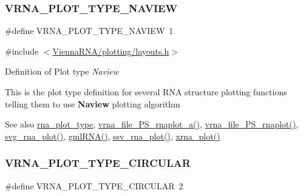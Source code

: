 \subsubsection{\texorpdfstring{V\+R\+N\+A\+\_\+\+P\+L\+O\+T\+\_\+\+T\+Y\+P\+E\+\_\+\+N\+A\+V\+I\+EW}{VRNA\_PLOT\_TYPE\_NAVIEW}}
{\footnotesize\ttfamily \#define V\+R\+N\+A\+\_\+\+P\+L\+O\+T\+\_\+\+T\+Y\+P\+E\+\_\+\+N\+A\+V\+I\+EW~1}



{\ttfamily \#include $<$\hyperlink{layouts_8h}{Vienna\+R\+N\+A/plotting/layouts.\+h}$>$}



Definition of Plot type {\itshape Naview} 

This is the plot type definition for several R\+NA structure plotting functions telling them to use {\bfseries Naview} plotting algorithm

\begin{DoxySeeAlso}{See also}
\hyperlink{group__plotting__utils_ga5964c4581431b098b80027d6e14dcdd4}{rna\+\_\+plot\+\_\+type}, \hyperlink{group__plotting__utils_ga139a31dd0ba9fc6612431f67de901c31}{vrna\+\_\+file\+\_\+\+P\+S\+\_\+rnaplot\+\_\+a()}, \hyperlink{group__plotting__utils_gabdc8f6548ba4a3bc3cd868ccbcfdb86a}{vrna\+\_\+file\+\_\+\+P\+S\+\_\+rnaplot()}, \hyperlink{group__plotting__utils_gae7853539b5df98f294b4af434e979304}{svg\+\_\+rna\+\_\+plot()}, \hyperlink{group__plotting__utils_ga70834bc8c0aad4fe6824ff76ccb8f329}{gml\+R\+N\+A()}, \hyperlink{group__plotting__utils_gadd368528755f9a830727b680243541df}{ssv\+\_\+rna\+\_\+plot()}, \hyperlink{group__plotting__utils_ga2f6d5953e6a323df898896b8d6614483}{xrna\+\_\+plot()} 
\end{DoxySeeAlso}
\mbox{\label{group__plotting__utils_ga8c9eac631348da92136c8363ecdd9fb9}} 
\subsubsection{\texorpdfstring{V\+R\+N\+A\+\_\+\+P\+L\+O\+T\+\_\+\+T\+Y\+P\+E\+\_\+\+C\+I\+R\+C\+U\+L\+AR}{VRNA\_PLOT\_TYPE\_CIRCULAR}}
{\footnotesize\ttfamily \#define V\+R\+N\+A\+\_\+\+P\+L\+O\+T\+\_\+\+T\+Y\+P\+E\+\_\+\+C\+I\+R\+C\+U\+L\+AR~2}



